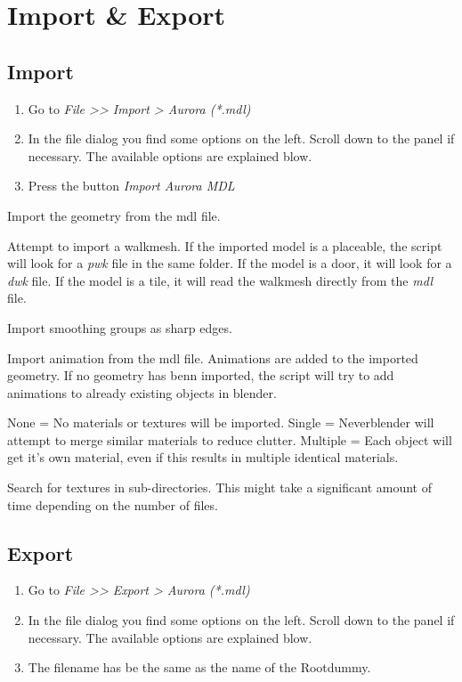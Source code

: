 \chapter{Import \& Export}

\section{Import}
\begin{enumerate}
	\item Go to \textit{File >> Import > Aurora (*.mdl)}
	\item In the file dialog you find some options on the left. Scroll down to the panel if necessary. The available options are explained blow.
	\item Press the button \textit{Import Aurora MDL}
\end{enumerate}

\begin{description}[leftmargin=13em,style=nextline]
    \item[Import Geometry] Import the geometry from the mdl file.
    \item[Import Walkmesh] Attempt to import a walkmesh. If the imported model is a placeable, the script will look for a {\textit{pwk}} file in the same folder. If the model is a door, it will look for a {\textit{dwk}} file. If the model is a tile, it will read the walkmesh directly from the {\textit{mdl}} file.
    \item[Import Smooth Groups] Import smoothing groups as sharp edges.
    \item[Import Animations] Import animation from the mdl file. Animations are added to the imported geometry. If no geometry has benn imported, the script will try to add animations to already existing objects in blender.
    \item[Materials] None = No materials or textures will be imported. Single = Neverblender will attempt to merge similar materials to reduce clutter. Multiple = Each object will get it's own material, even if this results in multiple identical materials.
    \item[Image Search] Search for textures in sub-directories. This might take a significant amount of time depending on the number of files.
\end{description}

\section{Export}
\begin{enumerate}
	\item Go to \textit{File >> Export > Aurora (*.mdl)}
	\item In the file dialog you find some options on the left. Scroll down to the panel if necessary. The available options are explained blow.
	\item The filename has be the same as the name of the Rootdummy.
\end{enumerate}

